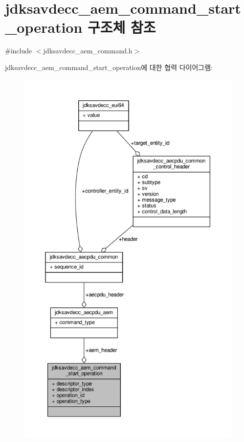 \hypertarget{structjdksavdecc__aem__command__start__operation}{}\section{jdksavdecc\+\_\+aem\+\_\+command\+\_\+start\+\_\+operation 구조체 참조}
\label{structjdksavdecc__aem__command__start__operation}


{\ttfamily \#include $<$jdksavdecc\+\_\+aem\+\_\+command.\+h$>$}



jdksavdecc\+\_\+aem\+\_\+command\+\_\+start\+\_\+operation에 대한 협력 다이어그램\+:
\nopagebreak
\begin{figure}[H]
\begin{center}
\leavevmode
\includegraphics[height=550pt]{structjdksavdecc__aem__command__start__operation__coll__graph}
\end{center}
\end{figure}
